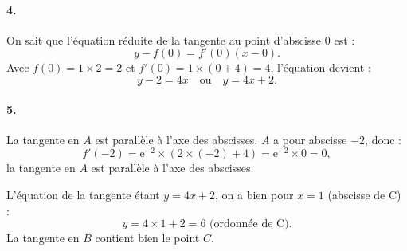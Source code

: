 \documentclass[10pt]{article}
\providecommand{\e}{{\mathrm{e}}}
\begin{document}
\paragraph{4.} On sait que l'équation réduite de la tangente au point d'abscisse \(0\) est :
\[
y - f(0) = f'(0)(x - 0).
\]
Avec \(f(0) = 1 \times 2 = 2\) et \(f'(0) = 1 \times (0 + 4) = 4\), l'équation devient :
\[
y - 2 = 4x \quad \text{ou} \quad y = 4x + 2.
\]

\paragraph{5.}
La tangente en \(A\) est parallèle à l'axe des abscisses.  
\(A\) a pour abscisse \(-2\), donc :
\[
f'(-2) = \e^{-2} \times (2 \times (-2) + 4) = \e^{-2} \times 0 = 0,
\]
la tangente en \(A\) est parallèle à l'axe des abscisses.

L'équation de la tangente étant \(y = 4x + 2\), on a bien pour \(x = 1\) (abscisse de C) :
\[
y = 4 \times 1 + 2 = 6 \text{ (ordonnée de C).}
\]
La tangente en \(B\) contient bien le point \(C\).
\end{document}
